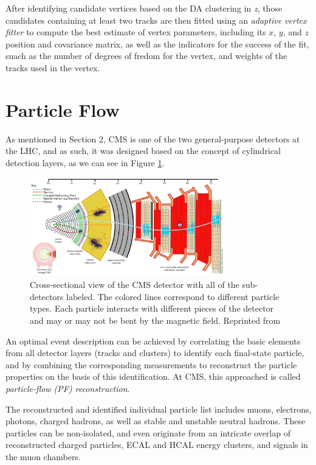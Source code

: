 After identifying candidate vertices based on the DA clustering in \textit{z}, those candidates containing at least two tracks are then fitted using an \textit{adaptive vertex fitter}\cite{Fruhwirth:1027031} to compute the best estimate of vertex parameters, including its $x$, $y$, and $z$ position and covariance matrix, as well as the indicators for the success of the fit, suach as the number of degrees of fredom for the vertex, and weights of the tracks used in the vertex.

\section{Particle Flow}

As mentioned in Section 2, CMS is one of the two general-purpose detectors at the LHC, and as such, it was designed based on the concept of cylindrical detection layers, as we can see in Figure \ref{fig:cmsslice}.

 \begin{figure}[h]
  	\label{fig:cmsslice}
 	\centering
 	\includegraphics[width=0.75\textwidth]{figures/image005.gif}
 	\singlespace
 	\caption{Cross-sectional view of the CMS detector with all of the sub-detectors labeled. The colored lines correspond to different particle types. Each particle interacts with different pieces of the detector and may or may not be bent by the magnetic field. Reprinted from \cite{CMSSlice}}
 \end{figure}

An optimal event description can be achieved by correlating the basic elements from all detector layers (tracks and clusters) to identify each final-state particle, and by combining the corresponding measurements to reconstruct the particle properties on the basis of this identification. At CMS, this approached is called \textit{particle-flow (PF) reconstruction}.

The reconstructed and identified individual particle list includes muons, electrons, photons, charged hadrons, as well as stable and unstable neutral hadrons. These particles can be non-isolated, and even originate from an intricate overlap of reconstructed charged particles, ECAL and HCAL energy clusters, and signals in the muon chambers.

